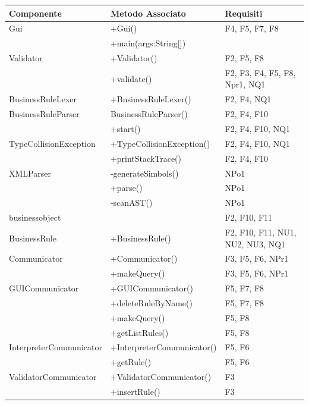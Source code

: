 \documentclass[11pt,titlepage,a4paper]{report}
\begin{document}
\begin{tabular}{||p{4.8cm}||p{5.3cm}||p{3.9cm}||}\hline
\hline
Componente & Metodo Associato & Requisiti \\\hline
Gui & +Gui() & F4, F5, F7, F8 \\\cline{2-3}
& +main(args:String[]) & \bigskip \\\hline

Validator & +Validator() & F2, F5, F8 \\\cline{2-3}
& +validate() & F2, F3, F4, F5, F8, Npr1, NQ1 \\\hline

BusinessRuleLexer & +BusinessRuleLexer() & F2, F4, NQ1 \\\hline

BusinessRuleParser & BusinessRuleParser() & F2, F4, F10 \\\cline{2-3}
& +start() & F2, F4, F10, NQ1 \\\hline

TypeCollisionException & +TypeCollisionException() & F2, F4, F10, NQ1 \\\cline{2-3}
& +printStackTrace() & F2, F4, F10 \\\hline

XMLParser & -generateSimbols() & NPo1 \\\cline{2-3}
& +parse() & NPo1 \\\cline{2-3}
& -scanAST() & NPo1 \\\hline

businessobject & \bigskip & F2, F10, F11 \\\hline

BusinessRule & +BusinessRule() & F2, F10, F11, NU1, NU2, NU3, NQ1 \\\hline

Communicator & +Communicator() & F3, F5, F6, NPr1 \\\cline{2-3}
& +makeQuery() & F3, F5, F6, NPr1 \\\hline

GUICommunicator & +GUICommunicator() & F5, F7, F8 \\\cline{2-3}
& +deleteRuleByName() & F5, F7, F8 \\\cline{2-3}
& +makeQuery() & F5, F8 \\\cline{2-3}
& +getListRules() & F5, F8 \\\hline

InterpreterCommunicator & +InterpreterCommunicator() & F5, F6 \\\cline{2-3}
& +getRule() & F5, F6 \\\hline

ValidatorCommunicator & +ValidatorCommunicator() & F3 \\\cline{2-3}
& +insertRule() & F3 \\\hline
\end{tabular}

\newpage
\end{document}
